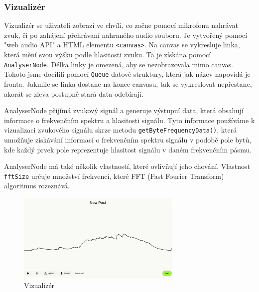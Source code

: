 \subsubsection{Vizualizér}

Vizualizér se uživateli zobrazí ve chvíli, co začne pomocí mikrofonu nahrávat zvuk,
či po zahájení přehrávaní nahraného audio souboru. Je vytvořený pomocí "web audio API"
a HTML elementu \texttt{<canvas>}. Na canvas se vykresluje linka, která mění svou výšku podle
hlasitosti zvuku. Ta je získána pomocí \texttt{AnalyserNode}. Délka linky je omezená, aby
se nezobrazovala mimo canvas. Tohoto jsme docílili pomocí \texttt{Queue} datové struktury, 
která jak název napovídá je fronta. Jakmile se linka dostane na konec canvasu, tak se 
vykreslovat nepřestane, akorát se zleva postupně stará data odebírají.

AnalyserNode přijímá zvukový signál a generuje výstupní data, která obsahují
informace o frekvenčním spektru a hlasitosti signálu. Tyto informace používáme 
k vizualizaci zvukového signálu skrze metodu \texttt{getByteFrequencyData()}, která
umožňuje získávání informací o frekvenčním spektru signálu v podobě pole bytů,
kde každý prvek pole reprezentuje hlasitost signálu v daném frekvenčním pásmu. \autocite{analysernode-mdn}

AnalyserNode má také několik vlastností, které ovlivňují jeho chování.
Vlastnost \texttt{fftSize} určuje množství frekvencí, které FFT (Fast Fourier Transform) algoritmus
rozeznává.

\begin{figure}[h!] 
    \centering
    \includegraphics[width=0.7\textwidth]{images/vizualizer.png}
    \caption{Vizualizér}
    \label{vizualizer}
\end{figure}

